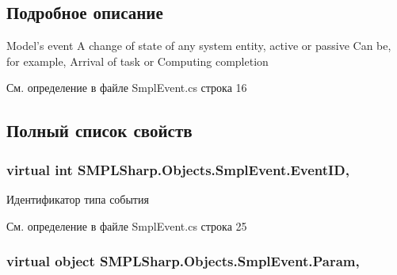 \subsection{Подробное описание}
Model's event A change of state of any system entity, active or passive Can be, for example, Arrival of task or Computing completion 



См. определение в файле Smpl\-Event.\-cs строка 16



\subsection{Полный список свойств}
\hypertarget{class_s_m_p_l_sharp_1_1_objects_1_1_smpl_event_a7ee1edd67c31aef8cd818f899a393abe}{
\subsubsection[{Event\-I\-D}]{\setlength{\rightskip}{0pt plus 5cm}virtual int S\-M\-P\-L\-Sharp.\-Objects.\-Smpl\-Event.\-Event\-I\-D\hspace{0.3cm}{\ttfamily [get]}, {\ttfamily [set]}}}\label{de/d57/class_s_m_p_l_sharp_1_1_objects_1_1_smpl_event_a7ee1edd67c31aef8cd818f899a393abe}


Идентификатор типа события 



См. определение в файле Smpl\-Event.\-cs строка 25

\hypertarget{class_s_m_p_l_sharp_1_1_objects_1_1_smpl_event_ae4cc80e480603021bc0d0d0e1ea2c666}{
\subsubsection[{Param}]{\setlength{\rightskip}{0pt plus 5cm}virtual object S\-M\-P\-L\-Sharp.\-Objects.\-Smpl\-Event.\-Param\hspace{0.3cm}{\ttfamily [get]}, {\ttfamily [set]}}}\label{de/d57/class_s_m_p_l_sharp_1_1_objects_1_1_smpl_event_ae4cc80e480603021bc0d0d0e1ea2c666}


